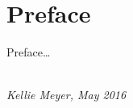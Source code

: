 \chapter*{Preface}

Preface\ldots

\begin{flushright}
{\makeatletter\itshape
    \@author \\
    Kellie Meyer, May 2016
\makeatother}
\end{flushright}


